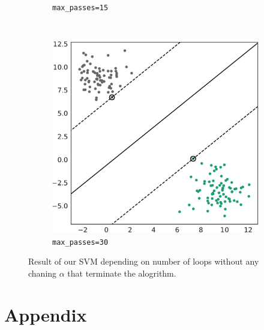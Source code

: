 \begin{figure}[h]
\begin{subfigure}[b]{0.32\textwidth}
        \caption{\texttt{max\_passes=15}}
        \label{fig:max_pass_15}
    \end{subfigure}
    ~ %
    \begin{subfigure}[b]{0.32\textwidth}
        \includegraphics[width=\textwidth]{media_saved/own_test_mpasses_30.pdf}
        \caption{\texttt{max\_passes=30}}
        \label{fig:max_pass_30}
    \end{subfigure}
    \caption{Result of our SVM depending on number of loops without any chaning $\alpha$ that terminate the alogrithm.}\label{fig:max_passes}
\end{figure}

\section*{Appendix}
\appendix
